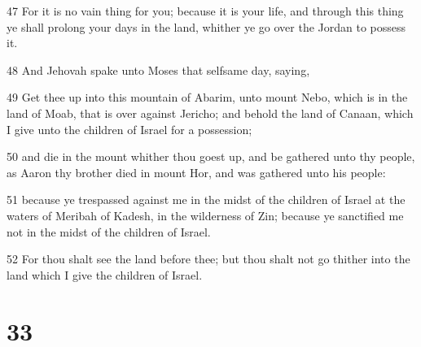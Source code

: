 \par 47 For it is no vain thing for you; because it is your life, and through this thing ye shall prolong your days in the land, whither ye go over the Jordan to possess it.
\par 48 And Jehovah spake unto Moses that selfsame day, saying,
\par 49 Get thee up into this mountain of Abarim, unto mount Nebo, which is in the land of Moab, that is over against Jericho; and behold the land of Canaan, which I give unto the children of Israel for a possession;
\par 50 and die in the mount whither thou goest up, and be gathered unto thy people, as Aaron thy brother died in mount Hor, and was gathered unto his people:
\par 51 because ye trespassed against me in the midst of the children of Israel at the waters of Meribah of Kadesh, in the wilderness of Zin; because ye sanctified me not in the midst of the children of Israel.
\par 52 For thou shalt see the land before thee; but thou shalt not go thither into the land which I give the children of Israel.

\chapter{33}

